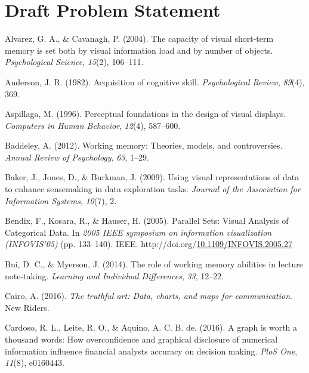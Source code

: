 \documentclass[print]{nuthesis}
\newlength{\cslhangindent}
\newenvironment{CSLReferences}[2]%
{\setlength{\parindent}{0pt}%
\everypar{\setlength{\hangindent}{\cslhangindent}}\ignorespaces}%
{\par}
\begin{document}
\hypertarget{draft-problem-statement}{%
\chapter{Draft Problem Statement}\label{draft-problem-statement}}

\hypertarget{refs}{}
\begin{CSLReferences}{1}{0}
\leavevmode{}%
Alvarez, G. A., \& Cavanagh, P. (2004). The capacity of visual short-term memory is set both by visual information load and by number of objects. \emph{Psychological Science}, \emph{15}(2), 106--111.

\leavevmode{}%
Anderson, J. R. (1982). Acquisition of cognitive skill. \emph{Psychological Review}, \emph{89}(4), 369.

\leavevmode{}%
Aspillaga, M. (1996). Perceptual foundations in the design of visual displays. \emph{Computers in Human Behavior}, \emph{12}(4), 587--600.

\leavevmode{}%
Baddeley, A. (2012). Working memory: Theories, models, and controversies. \emph{Annual Review of Psychology}, \emph{63}, 1--29.

\leavevmode{}%
Baker, J., Jones, D., \& Burkman, J. (2009). Using visual representations of data to enhance sensemaking in data exploration tasks. \emph{Journal of the Association for Information Systems}, \emph{10}(7), 2.

\leavevmode{}%
Bendix, F., Kosara, R., \& Hauser, H. (2005). {Parallel Sets: Visual Analysis of Categorical Data}. In \emph{2005 IEEE symposium on information visualization (INFOVIS'05)} (pp. 133--140). IEEE. http://doi.org/\href{https://doi.org/10.1109/INFOVIS.2005.27}{10.1109/INFOVIS.2005.27}

\leavevmode{}%
Bui, D. C., \& Myerson, J. (2014). The role of working memory abilities in lecture note-taking. \emph{Learning and Individual Differences}, \emph{33}, 12--22.

\leavevmode{}%
Cairo, A. (2016). \emph{The truthful art: Data, charts, and maps for communication}. New Riders.

\leavevmode{}%
Cardoso, R. L., Leite, R. O., \& Aquino, A. C. B. de. (2016). A graph is worth a thousand words: How overconfidence and graphical disclosure of numerical information influence financial analysts accuracy on decision making. \emph{PloS One}, \emph{11}(8), e0160443.


\end{CSLReferences}
\end{document}
